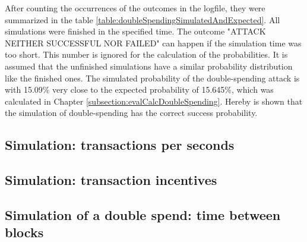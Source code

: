 After counting the occurrences of the outcomes in the logfile, they were summarized in the table \ref{table:doubleSpendingSimulatedAndExpected}. All simulations were finished in the specified time. The outcome "ATTACK NEITHER SUCCESSFUL NOR FAILED" can happen if the simulation time was too short. This number is ignored for the calculation of the probabilities. It is assumed that the unfinished simulations have a similar probability distribution like the finished ones. The simulated probability of the double-spending attack is with 15.09\% very close to the expected probability of 15.645\%, which was calculated in Chapter \ref{subsection:evalCalcDoubleSpending}. Hereby is shown that the simulation of double-spending has the correct success probability.

\subsection{Simulation: transactions per seconds}

\subsection{Simulation: transaction incentives}

\subsection{Simulation of a double spend: time between blocks}